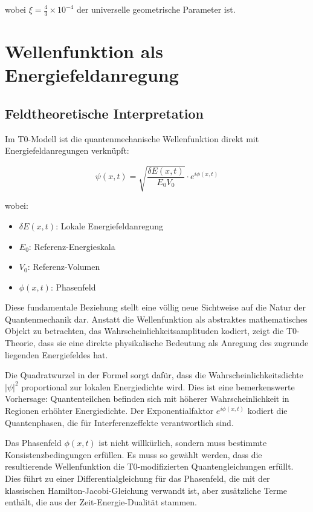\documentclass[12pt,a4paper]{article}
\newcommand{\deltaE}{\delta E}
\newcommand{\xipar}{\xi}
\theoremstyle{definition}
\theoremstyle{remark}
\begin{document}
wobei $\xipar = \frac{4}{3} \times 10^{-4}$ der universelle geometrische Parameter ist.

\section{Wellenfunktion als Energiefeldanregung}

\subsection{Feldtheoretische Interpretation}

Im T0-Modell ist die quantenmechanische Wellenfunktion direkt mit Energiefeldanregungen verkn{\"u}pft:

\begin{equation}
	\boxed{\psi(x,t) = \sqrt{\frac{\deltaE(x,t)}{E_0 V_0}} \cdot e^{i\phi(x,t)}}
	\label{eq:wavefunction_field}
\end{equation}

wobei:
\begin{itemize}
	\item $\deltaE(x,t)$: Lokale Energiefeldanregung
	\item $E_0$: Referenz-Energieskala
	\item $V_0$: Referenz-Volumen
	\item $\phi(x,t)$: Phasenfeld
\end{itemize}

Diese fundamentale Beziehung stellt eine v{\"o}llig neue Sichtweise auf die Natur der Quantenmechanik dar. Anstatt die Wellenfunktion als abstraktes mathematisches Objekt zu betrachten, das Wahrscheinlichkeitsamplituden kodiert, zeigt die T0-Theorie, dass sie eine direkte physikalische Bedeutung als Anregung des zugrunde liegenden Energiefeldes hat.

Die Quadratwurzel in der Formel sorgt daf{\"u}r, dass die Wahrscheinlichkeitsdichte $|\psi|^2$ proportional zur lokalen Energiedichte wird. Dies ist eine bemerkenswerte Vorhersage: Quantenteilchen befinden sich mit h{\"o}herer Wahrscheinlichkeit in Regionen erh{\"o}hter Energiedichte. Der Exponentialfaktor $e^{i\phi(x,t)}$ kodiert die Quantenphasen, die f{\"u}r Interferenzeffekte verantwortlich sind.

Das Phasenfeld $\phi(x,t)$ ist nicht willk{\"u}rlich, sondern muss bestimmte Konsistenzbedingungen erf{\"u}llen. Es muss so gew{\"a}hlt werden, dass die resultierende Wellenfunktion die T0-modifizierten Quantengleichungen erf{\"u}llt. Dies f{\"u}hrt zu einer Differentialgleichung f{\"u}r das Phasenfeld, die mit der klassischen Hamilton-Jacobi-Gleichung verwandt ist, aber zus{\"a}tzliche Terme enth{\"a}lt, die aus der Zeit-Energie-Dualit{\"a}t stammen.
\end{document}
